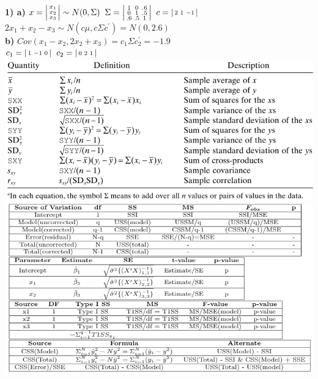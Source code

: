 \documentclass[10pt,landscape]{article}
\newenvironment{lsmallmatrix}
{\left|\begin{smallmatrix}}
	{\end{smallmatrix}\right|}
\newenvironment{lmat}
{\left|\begin{smallmatrix}}
	{\end{smallmatrix}\right|}
\begin{document}
\begin{multicols*}{4}
\textbf{1) a)} $x=\begin{lsmallmatrix}
x_1\\
x_2\\
x_3\\
\end{lsmallmatrix}\sim N(0,\Sigma)$ $\Sigma=\begin{lsmallmatrix}
1&0&.6\\
0&1&.5\\
.6&.5&1\\
\end{lsmallmatrix}$ $c=\begin{lsmallmatrix}
2 &1 &-1
\end{lsmallmatrix}$\\
$2x_1+x_2-x_3 \sim N(c\mu,c\Sigma c^{\prime})=N(0,2.6)$ \\
\textbf{b)} $Cov(x_1-x_2,2x_2+x_3)=c_1\Sigma c_2^{\prime}=-1.9$\\
$c_1=\begin{lmat}
1&-1&0
\end{lmat}$ $c_2=\begin{lmat}
0&2&1
\end{lmat}$\\
\includegraphics[scale=.3]{olsdefn.png}\\
\includegraphics[scale=.535]{ss2.png}\\
\end{multicols*} 
\end{document}
